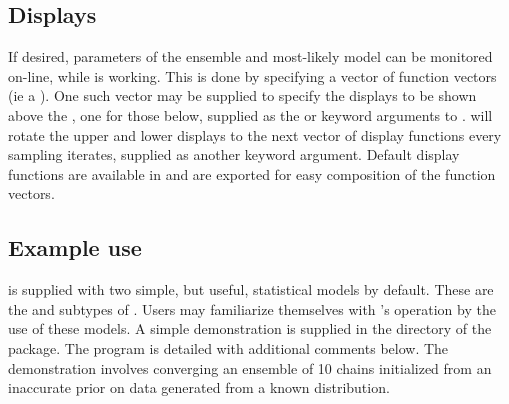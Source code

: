 \subsection{Displays}
If desired, parameters of the ensemble and most-likely model can be monitored on-line, while  is working. This is done by specifying a vector of function vectors (ie a ). One such vector may be supplied to specify the displays to be shown above the , one for those below, supplied as the  or  keyword arguments to .  will rotate the upper and lower displays to the next vector of display functions every  sampling iterates, supplied as another  keyword argument. Default display functions are available in  and are exported for easy composition of the function vectors.

\subsection{Example use}
 is supplied with two simple, but useful, statistical models by default. These are the  and  subtypes of . Users may familiarize themselves with 's operation by the use of these models. A simple demonstration is supplied in the  directory of the package. The program is detailed with additional comments below. The demonstration involves converging an ensemble of 10  chains initialized from an inaccurate  prior on data generated from a known  distribution.

